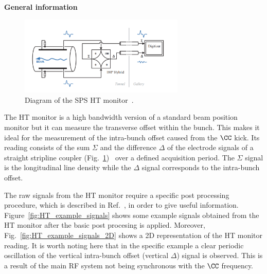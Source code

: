 \normalsize{\textbf{General information}}\\
\begin{figure}[h]
   \centering         
   \includegraphics[width=0.7\textwidth]{images/Ch4/SPS_HT_monitor_diagram_modified.png}
       \caption{Diagram of the SPS HT monitor~\cite{Levens:2313358}.}
       \label{fig:SPS_HT_diagram}
\end{figure}
The HT monitor is a high bandwidth version of a standard beam position monitor but it can measure the transverse offset within the bunch. This makes it ideal for the measurement of the intra-bunch offset caused from the $\CC$ kick. Its reading consists of the sum $\Sigma$ and the  difference $\Delta$ of the electrode signals of a straight stripline coupler (Fig.~\ref{fig:SPS_HT_diagram})~\cite{Jones:987561, Levens:2313358} over a defined acquisition period. The $\Sigma$ signal is the longitudinal line density while the $\Delta$ signal corresponds to the intra-bunch offset. 

The raw signals from the HT monitor require a specific post processing procedure, which is described in Ref.~\cite{Levens:2313358}, in order to give useful information. Figure~\ref{fig:HT_example_signals} shows some example signals obtained from the HT monitor after the basic post procesing is applied. Moreover, Fig.~\ref{fig:HT_example_signals_2D} shows a 2D representation of the HT monitor reading. It is worth noting here that in the specific example a clear periodic oscillation of the vertical intra-bunch offset (vertical $\Delta$) signal is observed. This is a result of the main RF system not being synchronous with the  $\CC$  frequency. 



